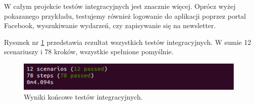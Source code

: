 W całym projekcie testów integracyjnych jest znacznie więcej. Oprócz wyżej pokazanego przykładu, testujemy również logowanie do aplikacji poprzez portal Facebook, wyszukiwanie wydarzeń, czy zapisywanie się na newsletter.

Rysunek nr \ref{fig:rspec} przedstawia rezultat wszystkich testów integracyjnych. W sumie 12 scenariuszy i 78 kroków, wszystkie spełnione pomyślnie.

\begin{figure}[h]
  \centering
  \includegraphics[scale=0.8]{images/bdd_result.png}
  \caption{Wyniki końcowe testów integracyjnych.}
  \label{fig:rspec}
\end{figure}

\newpage
